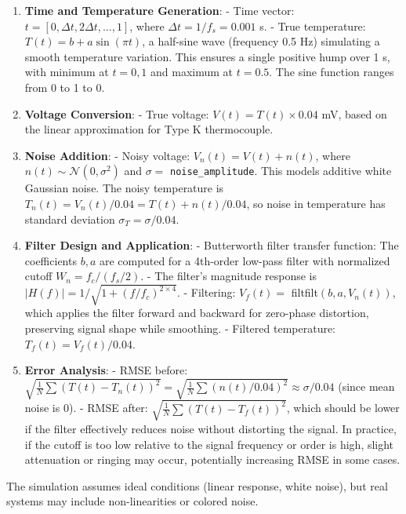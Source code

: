 \documentclass[12pt]{article}
\begin{document}
\begin{enumerate}
    \item \textbf{Time and Temperature Generation}:
    - Time vector: \( t = [0, \Delta t, 2\Delta t, \dots, 1] \), where \( \Delta t = 1/f_s = 0.001 \) s.
    - True temperature: \( T(t) = b + a \sin(\pi t) \), a half-sine wave (frequency 0.5 Hz) simulating a smooth temperature variation. This ensures a single positive hump over 1 s, with minimum at \( t=0,1 \) and maximum at \( t=0.5 \). The sine function ranges from 0 to 1 to 0.

    \item \textbf{Voltage Conversion}:
    - True voltage: \( V(t) = T(t) \times 0.04 \) mV, based on the linear approximation for Type K thermocouple.

    \item \textbf{Noise Addition}:
    - Noisy voltage: \( V_n(t) = V(t) + n(t) \), where \( n(t) \sim \mathcal{N}(0, \sigma^2) \) and \( \sigma = \) \texttt{noise\_amplitude}. This models additive white Gaussian noise. The noisy temperature is \( T_n(t) = V_n(t) / 0.04 = T(t) + n(t)/0.04 \), so noise in temperature has standard deviation \( \sigma_T = \sigma / 0.04 \).

    \item \textbf{Filter Design and Application}:
    - Butterworth filter transfer function: The coefficients \( b, a \) are computed for a 4th-order low-pass filter with normalized cutoff \( W_n = f_c / (f_s / 2) \).
    - The filter's magnitude response is \( |H(f)| = 1 / \sqrt{1 + (f / f_c)^{2 \times 4}} \).
    - Filtering: \( V_f(t) = \) filtfilt\((b, a, V_n(t))\), which applies the filter forward and backward for zero-phase distortion, preserving signal shape while smoothing.
    - Filtered temperature: \( T_f(t) = V_f(t) / 0.04 \).

    \item \textbf{Error Analysis}:
    - RMSE before: \( \sqrt{\frac{1}{N} \sum (T(t) - T_n(t))^2} = \sqrt{\frac{1}{N} \sum (n(t)/0.04)^2} \approx \sigma / 0.04 \) (since mean noise is 0).
    - RMSE after: \( \sqrt{\frac{1}{N} \sum (T(t) - T_f(t))^2} \), which should be lower if the filter effectively reduces noise without distorting the signal. In practice, if the cutoff is too low relative to the signal frequency or order is high, slight attenuation or ringing may occur, potentially increasing RMSE in some cases.
\end{enumerate}

The simulation assumes ideal conditions (linear response, white noise), but real systems may include non-linearities or colored noise.
\end{document}
